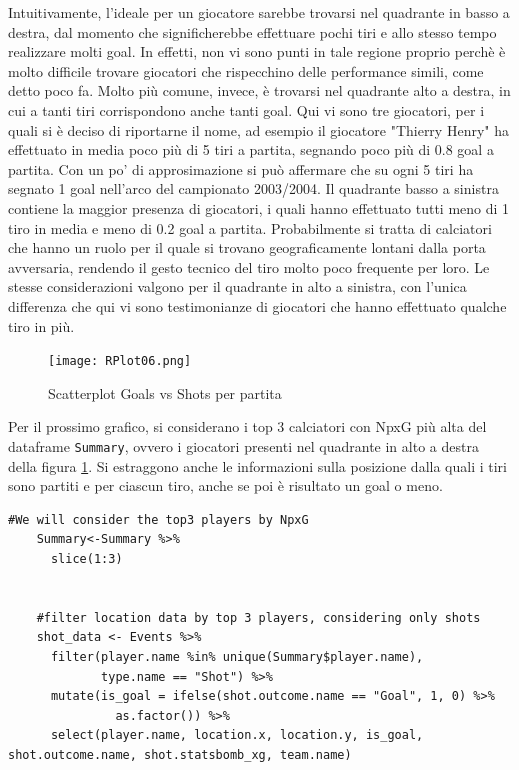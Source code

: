             Intuitivamente, l'ideale per un giocatore sarebbe trovarsi nel quadrante in basso a destra, dal momento che significherebbe effettuare pochi tiri e allo stesso tempo realizzare molti goal. In effetti, non vi sono punti in tale regione proprio perchè è molto difficile trovare giocatori che rispecchino delle performance simili, come detto poco fa. Molto più comune, invece, è trovarsi nel quadrante alto a destra, in cui a tanti tiri corrispondono anche tanti goal. Qui vi sono tre giocatori, per i quali si è deciso di riportarne il nome, ad esempio il giocatore "Thierry Henry" ha effettuato in media poco più di 5 tiri a partita, segnando poco più di 0.8 goal a partita. Con un po' di approsimazione si può affermare che su ogni 5 tiri ha segnato 1 goal nell'arco del campionato 2003/2004. Il quadrante basso a sinistra contiene la maggior presenza di giocatori, i quali hanno effettuato tutti meno di 1 tiro in media e meno di 0.2 goal a partita. Probabilmente si tratta di calciatori che hanno un ruolo per il quale si trovano geograficamente lontani dalla porta avversaria, rendendo il gesto tecnico del tiro molto poco frequente per loro. Le stesse considerazioni valgono per il quadrante in alto a sinistra, con l'unica differenza che qui vi sono testimonianze di giocatori che hanno effettuato qualche tiro in più.

            \begin{figure}[h]
                \texttt{[image: RPlot06.png]}
                \centering
                \caption{Scatterplot Goals vs Shots per partita}
                \label{fig:RPlot06}
            \end{figure}

            Per il prossimo grafico, si considerano i top 3 calciatori con NpxG più alta del dataframe \texttt{Summary}, ovvero i giocatori presenti nel quadrante in alto a destra della figura \ref{fig:RPlot06}. Si estraggono anche le informazioni sulla posizione dalla quali i tiri sono partiti e per ciascun tiro, anche se poi è risultato un goal o meno.

            \vspace{10pt}

            \begin{lstlisting}[numbers=None]
    #We will consider the top3 players by NpxG
    Summary<-Summary %>% 
      slice(1:3)
    
    
    #filter location data by top 3 players, considering only shots
    shot_data <- Events %>% 
      filter(player.name %in% unique(Summary$player.name),
             type.name == "Shot") %>% 
      mutate(is_goal = ifelse(shot.outcome.name == "Goal", 1, 0) %>% 
               as.factor()) %>% 
      select(player.name, location.x, location.y, is_goal, shot.outcome.name, shot.statsbomb_xg, team.name)
            \end{lstlisting}


